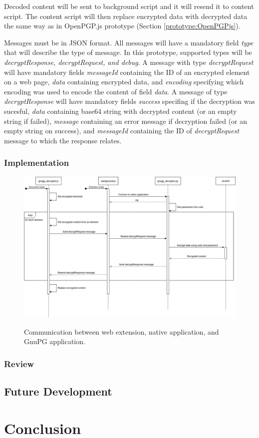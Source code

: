 Decoded content will be sent to background script and it will resend it to content script. The content script will then replace encrypted data with decrypted data the same way as in OpenPGP.js prototype (Section \ref{prototype:OpenPGPjs}).

Messages must be in JSON format. All messages will have a mandatory field \textit{type} that will describe the type of message. In this prototype, supported types will be \textit{decryptResponse, decryptRequest, and debug}. A message with type \textit{decryptRequest} will have mandatory fields \textit{messageId} containing the ID of an encrypted element on a web page, \textit{data} containing encrypted data, and \textit{encoding} specifying which encoding was used to encode the content of field \textit{data}. A message of type \textit{decryptResponse} will have mandatory fields \textit{success} specifing if the decryption was sucesful, \textit{data} containing base64 string with decrypted content (or an empty string if failed),  \textit{message} containing an error message if decryption failed (or an empty string on success), and \textit{messageId} containing the ID of \textit{decryptRequest} message to which the response relates.

\subsection{Implementation}

\begin{figure}[H]
    \begin{center}
        \label{img:openpgp-sequence}
        \includegraphics[width=1.0\textwidth]{obrazky-figures/sequence-gnupg_decryptor.png}
        \caption{Communication between web extension, native application, and GnuPG application.}
    \end{center}
\end{figure}


\subsection{Review}

\section{Future Development}

\chapter{Conclusion}
